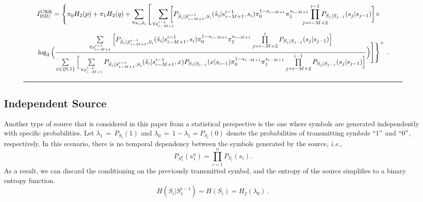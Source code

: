 \documentclass[journal]{IEEEtranTCOM}
\begin{document}
\begin{figure}[t!]
\begin{align}
\begin{split}
    &I_{\text{ISIU}}^{\text{CRR}} =\Bigg\{ \pi_{0}H_{2}(p)+\pi_{1}H_{2}(q) +
    \sum_{\forall s_{i},\hat{s}_{i}}\Bigg[\sum_{\forall s^{i-1}_{i-M+1}}\hspace{-0.3cm}\bigg[P_{\hat{S}_{i}|S^{i-1}_{i-M+1},S_{i}}(\hat{s}_{i}|s^{i-1}_{i-M+1},s_{i})\pi_{0}^{1-s_{i-M+1}} \pi_{1}^{s_{i-M+1}}
    \hspace{-0.4cm}\prod\limits_{\substack{j=i-M+2}}^{i-1} \hspace{-0.4cm}P_{S_{j}|S_{j-1}}(s_{j}|s_{j-1})\bigg]\times\\&
    \log_{2}\Big(\frac{\sum\limits_{\substack{\forall s^{i-1}_{i-M+1}}}\Big[P_{\hat{S}_{i}|S^{i-1}_{i-M+1},S_{i}}(\hat{s}_{i}|s^{i-1}_{i-M+1},s_{i})\pi_{0}^{1-s_{i-M+1}} \pi_{1}^{s_{i-M+1}}\prod\limits_{\substack{j=i-M+2}}^{i} P_{S_{j}|S_{j-1}}(s_{j}|s_{j-1})\Big]}{\sum\limits_{\substack{x\in\{0,1\}}}\Big[\sum\limits_{\substack{\forall s^{i-1}_{i-M+1}}}P_{\hat{S}_{i}|S^{i-1}_{i-M+1},S_{i}}(\hat{s}_{i}|s^{i-1}_{i-M+1},x)P_{S_{i}|S_{i-1}}(x|s_{i-1})\pi_{0}^{1-s_{i-M+1}} \pi_{1}^{s_{i-M+1}}\prod\limits_{\substack{j=i-M+2}}^{i-1} P_{S_{j}|S_{j-1}}(s_{j}|s_{j-1})\Big]}\Big)\Bigg]\Bigg\}^{+}~.\label{eq:I_ISIU_CRR}
\end{split}
\end{align}
\hrule
\end{figure}
\subsection{Independent Source}
Another type of source that is considered in this paper from a statistical perspective is the one where symbols are generated independently with specific probabilities. Let $\lambda_{1}$$\,=\,$$P_{S_i}(1)$ and $\lambda_{0}$$\,=\,$$1-\lambda_{1}=P_{S_i}(0)$ denote the probabilities of transmitting symbols $``1"$ and $``0"$, respectively. In this scenario, there is no temporal dependency between the symbols generated by the source, \textit{i.e.},
\begin{equation}
    P_{S_1^n}(s_1^n) = \prod_{i=1}^n P_{S_i}(s_i).
\end{equation}
As a result, we can discard the conditioning on the previously transmitted symbol, and the entropy of the source simplifies to a binary entropy function.
\begin{equation}
    H(S_{i}|S_{1}^{i-1}) = H(S_{i}) = H_{2}(\lambda_{0})~.
\end{equation}
\end{document}
